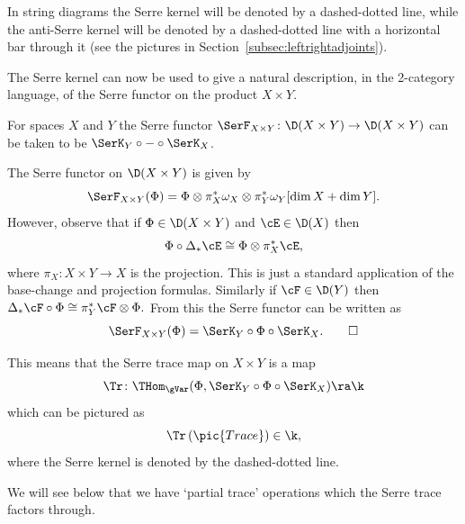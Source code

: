 \begin{Notation}
In string diagrams the Serre kernel will be denoted by a dashed-dotted
line, while the anti-Serre kernel will be denoted by a dashed-dotted
line with a horizontal bar through it (see the pictures in
Section~\ref{subsec:leftrightadjoints}).
\end{Notation}
\noindent
The Serre kernel can now be used to give a natural description, in the
2-category language, of the Serre functor on the product $X\times Y$.

\begin{Proposition}
For spaces $X$ and $Y$ the Serre functor $\SerF_{X\times Y}\colon
\D(X\times Y)\to \D(X\times Y)$
can be taken to be $\SerK_Y\circ{-}\circ\SerK_X$.
\end{Proposition}

\begin{Proof}
The Serre functor on $\D(X\times Y)$ is given by
\[\SerF_{X\times Y}(\Phi)= \Phi\otimes \pi_X^*\omega_X\otimes
\pi_Y^*\omega_Y[\dim X+\dim Y].\]
However, observe that if $\Phi\in \D(X\times Y)$ and $\cE\in \D(X)$
then
\[\Phi\circ \Delta_*\cE\cong \Phi\otimes \pi_X^* \cE,\]
where $\pi_X\colon X\times Y \to X$ is the projection.  This is just a
standard application of the base-change and projection formulas.
Similarly if $\cF\in \D(Y)$ then \( \Delta_*\cF\circ\Phi\cong \pi_Y^*
\cF\otimes\Phi.\) From this the Serre functor can be written as
\[\SerF_{X\times Y}(\Phi)= \SerK_Y\circ\Phi\circ \SerK_X.\qedhere\]
\end{Proof}

\noindent
This means that the Serre trace map on $X\times Y$ is a map
\[ \Tr\colon\THom_\gVar(\Phi, \SerK_Y \circ\Phi\circ\SerK_X) \ra \k \]
which can be pictured as
\[\Tr\left(\pic{Trace}\right) \in \k,\]
where the Serre kernel is denoted by the dashed-dotted line.

We will see below that we have `partial trace' operations which the
Serre trace factors through.


